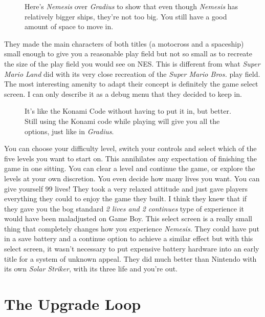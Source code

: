 \documentclass{book}
\begin{document}
\FloatBarrier\vspace{\baselineskip}\begin{figure}[H]\caption*{Here’s \emph{Nemesis} over \emph{Gradius} to show that even though \emph{Nemesis} has relatively bigger ships, they’re not too big. You still have a good amount of space to move in.}\end{figure}
They made the main characters of both titles (a motocross and a spaceship) small enough to give you a reasonable play field but not so small as to recreate the size of the play field you would see on NES. This is different from what \emph{Super Mario Land} did with its very close recreation of the \emph{Super Mario Bros.} play field. The most interesting amenity to adapt their concept is definitely the game select screen. I can only describe it as a debug menu that they decided to keep in.\par
\FloatBarrier\vspace{\baselineskip}\begin{figure}[H]\caption*{It’s like the Konami Code without having to put it in, but better. Still using the Konami code while playing will give you all the options, just like in \emph{Gradius}.}\end{figure}
You can choose your difficulty level, switch your controls and select which of the five levels you want to start on. This annihilates any expectation of finishing the game in one sitting. You can clear a level and continue the game, or explore the levels at your own discretion. You even decide how many lives you want. You can give yourself 99 lives! They took a very relaxed attitude and just gave players everything they could to enjoy the game they built. I think they knew that if they gave you the bog standard \emph{2 lives and 2 continues} type of experience it would have been maladjusted on Game Boy. This select screen is a really small thing that completely changes how you experience \emph{Nemesis}. They could have put in a save battery and a continue option to achieve a similar effect but with this select screen, it wasn’t necessary to put expensive battery hardware into an early title for a system of unknown appeal. They did much better than Nintendo with its own \emph{Solar Striker}, with its three life and you’re out.\par
\FloatBarrier\section*{The Upgrade Loop}
\end{document}
